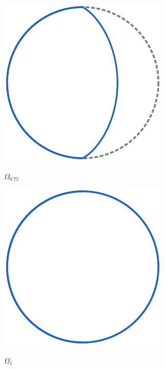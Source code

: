 \documentclass[crop, fleqn]{standalone}
\begin{document}
\hspace{3pt}
\begin{minipage}{60pt}
    \includegraphics[width=\linewidth]{main-theorem/moon-3.pdf}

    \vspace*{-5pt}
    \hspace{5pt}$\displaystyle \Omega_{0.75} $
    \vspace*{5pt}
\end{minipage}
\hspace{3pt}
\begin{minipage}{60pt}
    \includegraphics[width=\linewidth]{main-theorem/moon-4.pdf}

    \vspace*{-5pt}
    \hspace{5pt}$\displaystyle \Omega_{1} $
    \vspace*{5pt}
\end{minipage}
\end{document}
